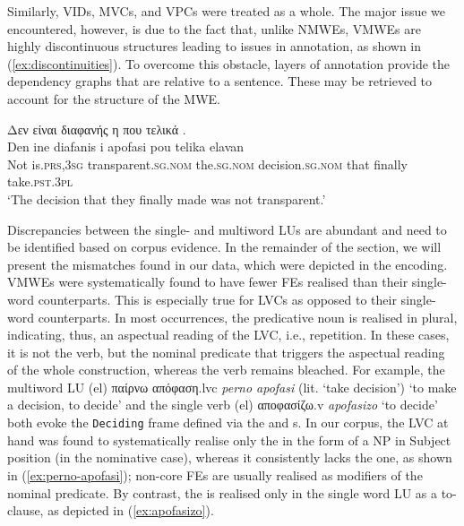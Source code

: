 \documentclass[output=paper,colorlinks,citecolor=brown]{langscibook}
\begin{document}
Similarly, VIDs, MVCs, and VPCs were treated as a whole. The major issue we encountered, however, is due to the fact that, unlike NMWEs, VMWEs are highly discontinuous structures leading to issues in annotation, as shown in (\ref{ex:discontinuities}). To overcome this obstacle, layers of annotation provide the dependency graphs that are relative to a sentence. These may be retrieved to account for the structure of the MWE. 

\ea
\label{ex:discontinuities}
\glll
Δεν είναι διαφανής η  που τελικά . \\
Den ine diafanis i apofasi pou telika elavan \\
Not is.\textsc{prs,3sg} transparent.\textsc{sg.nom} the.\textsc{sg.nom} decision.\textsc{sg.nom} that finally take.\textsc{pst.3pl} \\
\glt ‘The decision that they finally made was not transparent.’
\z

Discrepancies between the single- and multiword LUs are abundant and need to be identified based on corpus evidence. In the remainder of the section, we will present the mismatches found in our data, which were depicted in the encoding. VMWEs were systematically found to have fewer FEs realised than their single-word counterparts. This is especially true for LVCs as opposed to their single-word counterparts. In most occurrences, the predicative noun is realised in plural, indicating, thus, an aspectual reading of the LVC, i.e., repetition. In these cases, it is not the verb, but the nominal predicate that triggers the aspectual reading of the whole construction, whereas the verb remains bleached. For example, the multiword LU (el) {{παίρνω}} {{απόφαση}}.lvc \textit{perno apofasi} (lit. `take decision') ‘to make a decision, to decide' and the single verb (el) {αποφασίζω}.v \textit{apofasizo} `to decide' both evoke the \texttt{Deciding} frame defined via the  and s. In our corpus, the LVC at hand was found to systematically realise only the  in the form of a NP in Subject position (in the nominative case), whereas it consistently lacks the  one, as shown in (\ref{ex:perno-apofasi}); non-core FEs are usually realised as modifiers of the nominal predicate. By contrast, the  is realised only in the single word LU as a to-clause, as depicted in (\ref{ex:apofasizo}). 
\end{document}

